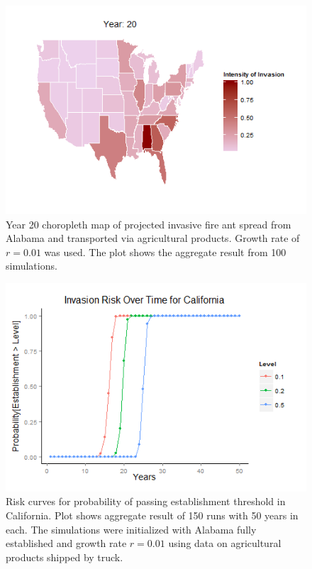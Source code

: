 \documentclass[12pt]{article}
\begin{document}
		
				

\begin{figure}[h]
	\centering
		\includegraphics{agprod.png}
	\caption{Year 20 choropleth map of projected invasive fire ant spread from Alabama and transported via agricultural products. Growth rate of $r = 0.01$ was used. The plot shows the aggregate result from 100 simulations.}
	\label{fig:spread map}
\end{figure}

\begin{figure}[h]
	\begin{center}
		\includegraphics{riskcurve.png}
	\end{center}
	\caption{Risk curves for probability of passing establishment threshold in California. Plot shows aggregate result of 150 runs with 50 years in each. The simulations were initialized with Alabama fully established and growth rate $r = 0.01$ using data on agricultural products shipped by truck. }
	\label{fig:risk curve}
\end{figure}
\end{document}
